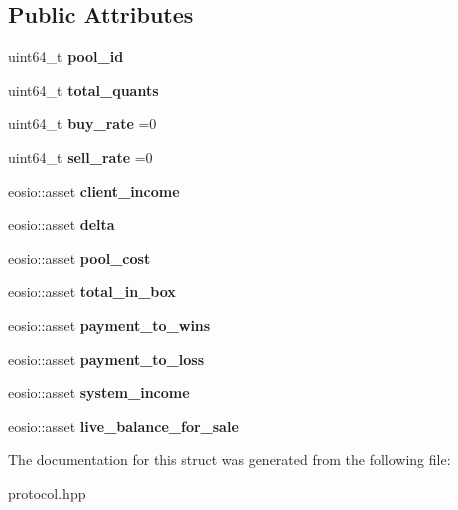 \subsection*{Public Attributes}
\begin{DoxyCompactItemize}
\item 
\mbox{\label{structeosio_1_1rate_a205ae907e009ec24ad2212d0c75b5a6b}} 
uint64\+\_\+t {\bfseries pool\+\_\+id}
\item 
\mbox{\label{structeosio_1_1rate_aa90af9b47bb489ff61648408a72e7f44}} 
uint64\+\_\+t {\bfseries total\+\_\+quants}
\item 
\mbox{\label{structeosio_1_1rate_ac237db097faa9cd2720ba50d26894d8a}} 
uint64\+\_\+t {\bfseries buy\+\_\+rate} =0
\item 
\mbox{\label{structeosio_1_1rate_abf8377a81b33a42ae17385e49cbb9853}} 
uint64\+\_\+t {\bfseries sell\+\_\+rate} =0
\item 
\mbox{\label{structeosio_1_1rate_a95e3a9781b35120783572f9888e75cca}} 
eosio\+::asset {\bfseries client\+\_\+income}
\item 
\mbox{\label{structeosio_1_1rate_ace9faf2ba1a790e2111a41faed7b770b}} 
eosio\+::asset {\bfseries delta}
\item 
\mbox{\label{structeosio_1_1rate_ad2fe3a742f8f3b2b4f752623da829e29}} 
eosio\+::asset {\bfseries pool\+\_\+cost}
\item 
\mbox{\label{structeosio_1_1rate_a6af57aef0a8c91f2472a64d53e93a791}} 
eosio\+::asset {\bfseries total\+\_\+in\+\_\+box}
\item 
\mbox{\label{structeosio_1_1rate_aedf100727a10ec7e8c79d5f15506f5f1}} 
eosio\+::asset {\bfseries payment\+\_\+to\+\_\+wins}
\item 
\mbox{\label{structeosio_1_1rate_afdbe58b4086a75bfcfab5f1c572b5ce8}} 
eosio\+::asset {\bfseries payment\+\_\+to\+\_\+loss}
\item 
\mbox{\label{structeosio_1_1rate_a72eadaf4f9053b0c23dae37600854503}} 
eosio\+::asset {\bfseries system\+\_\+income}
\item 
\mbox{\label{structeosio_1_1rate_ad165d68d00b1c717205dbc971ae43206}} 
eosio\+::asset {\bfseries live\+\_\+balance\+\_\+for\+\_\+sale}
\end{DoxyCompactItemize}


The documentation for this struct was generated from the following file\+:\begin{DoxyCompactItemize}
\item 
protocol.\+hpp\end{DoxyCompactItemize}

